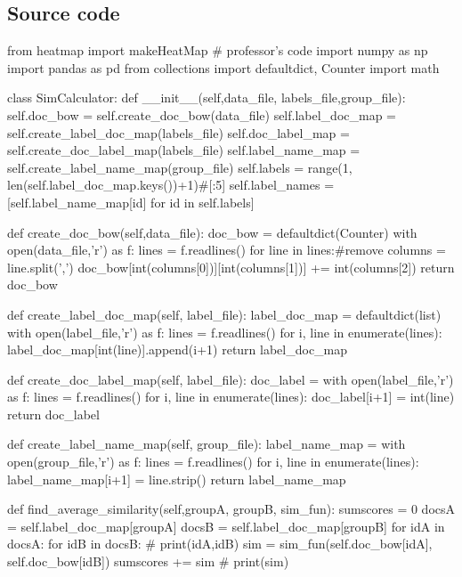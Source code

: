 \documentclass{homeworg}
\let\Oldsubsection\subsection
\renewcommand{\subsection}{\FloatBarrier\Oldsubsection}
\begin{document}
\subsection{Source code}
\begin{python}
from heatmap import makeHeatMap # professor's code
import numpy as np
import pandas as pd
from collections import defaultdict, Counter
import math


class SimCalculator:
    def __init__(self,data_file, labels_file,group_file):
        self.doc_bow = self.create_doc_bow(data_file)
        self.label_doc_map = self.create_label_doc_map(labels_file)
        self.doc_label_map = self.create_doc_label_map(labels_file)
        self.label_name_map = self.create_label_name_map(group_file)
        self.labels = range(1, len(self.label_doc_map.keys())+1)#[:5]
        self.label_names = [self.label_name_map[id] for id in self.labels]
    
    def create_doc_bow(self,data_file):
        doc_bow = defaultdict(Counter)
        with open(data_file,'r') as f:
            lines = f.readlines()
            for line in lines:#remove
                columns = line.split(',')
                doc_bow[int(columns[0])][int(columns[1])] += int(columns[2])
        return doc_bow

    def create_label_doc_map(self, label_file):
        label_doc_map = defaultdict(list)
        with open(label_file,'r') as f:
            lines = f.readlines()
            for i, line in enumerate(lines):
                label_doc_map[int(line)].append(i+1)
        return label_doc_map
    
    def create_doc_label_map(self, label_file):
        doc_label = {}
        with open(label_file,'r') as f:
            lines = f.readlines()
            for i, line in enumerate(lines):
                doc_label[i+1] = int(line)
        return doc_label


    def create_label_name_map(self, group_file):
        label_name_map = {}
        with open(group_file,'r') as f:
            lines = f.readlines()
            for i, line in enumerate(lines):
                label_name_map[i+1] = line.strip()
        return label_name_map
    

    def find_average_similarity(self,groupA, groupB, sim_fun):
        sumscores = 0
        docsA = self.label_doc_map[groupA]
        docsB = self.label_doc_map[groupB]
        for idA in docsA:
            for idB in docsB:
                # print(idA,idB)
                sim = sim_fun(self.doc_bow[idA], self.doc_bow[idB])
                sumscores += sim
                # print(sim)


\end{python}
\end{document}
